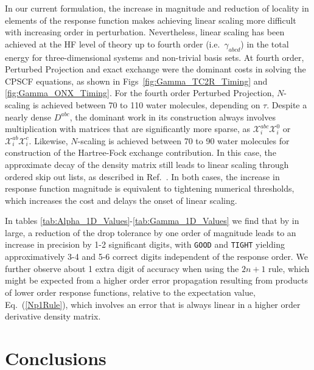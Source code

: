 \documentclass[prl,aps,letterpaper,twocolumn,showpacs,twocolumngrid,superbib]{revtex4}
\def\X{\mathcal{X}}
\begin{document}
In our current formulation, the increase in magnitude and reduction of locality in elements of the 
response function makes achieving linear scaling more difficult with increasing order in perturbation. 
Nevertheless, linear scaling has been achieved at the HF level of theory up to fourth order (i.e.~$\gamma_{abcd}$) 
in the total energy for three-dimensional systems and  non-trivial basis sets.  At fourth order,
Perturbed Projection and exact exchange were the dominant costs in solving the CPSCF equations,
as shown in Figs~\ref{fig:Gamma_TC2R_Timing} and \ref{fig:Gamma_ONX_Timing}.  For the fourth order Perturbed Projection, 
$N$-scaling is achieved 
between 70 to 110 water molecules, depending on $\tau$.  Despite a nearly dense $D^{abc}$, the 
dominant work in its construction always involves multiplication with matrices that are significantly 
more sparse, as $\X^{abc}_i\X^{0}_i$ or $\X^{ab}_i\X^{c}_i$.   Likewise, $N$-scaling is achieved between 
70 to 90 water molecules for construction of the Hartree-Fock exchange contribution.  In this case, 
the approximate decay of the density matrix still leads to linear scaling through ordered skip out lists,
as described in Ref.~.  In both cases, the increase in response function magnitude
is equivalent to tightening numerical thresholds, which increases the cost and delays the onset of linear
scaling. 

In tables \ref{tab:Alpha_1D_Values}-\ref{tab:Gamma_1D_Values} we find that by in large, 
a reduction of the drop tolerance by one order of magnitude leads to an increase in precision by
1-2 significant digits, with {\tt GOOD} and {\tt TIGHT} yielding approximatively 3-4 and 5-6 
correct digits  independent of the response order.  We further observe about 1 extra digit of accuracy 
when using the $2n+1$ rule, which might be expected from a higher order error propagation resulting from 
products of lower order response functions, relative to the expectation value, Eq.~(\ref{Np1Rule}), 
which involves an error that is always linear in a higher order derivative density matrix.  

\section{Conclusions}
\end{document}
